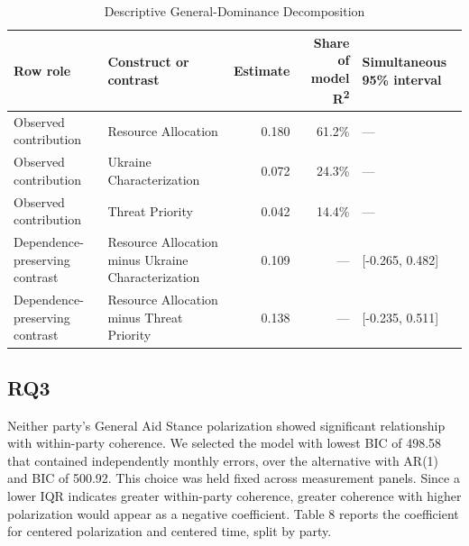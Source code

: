 \begin{table}[htbp]
\centering
\small
\begin{threeparttable}
\caption{Descriptive General-Dominance Decomposition}
\label{tab:7}
\begin{tabularx}{\textwidth}{@{}L{0.95}L{1.25}rrL{1.05}@{}}
\toprule
\textbf{Row role} & \textbf{Construct or contrast} & \textbf{Estimate} & \textbf{Share of model R\textsuperscript{2}} & \textbf{Simultaneous 95\% interval} \\
\midrule
Observed contribution & Resource Allocation & 0.180 & 61.2\% & --- \\
Observed contribution & Ukraine Characterization & 0.072 & 24.3\% & --- \\
Observed contribution & Threat Priority & 0.042 & 14.4\% & --- \\
Dependence-preserving contrast & Resource Allocation minus Ukraine Characterization & 0.109 & --- & [-0.265, 0.482] \\
Dependence-preserving contrast & Resource Allocation minus Threat Priority & 0.138 & --- & [-0.235, 0.511] \\
\bottomrule
\end{tabularx}
\end{threeparttable}
\end{table}


\subsection{RQ3}

Neither party's General Aid Stance polarization showed significant relationship with within-party coherence. We selected the model with lowest BIC of 498.58 that contained independently monthly errors, over the alternative with AR(1) and BIC of 500.92. This choice was held fixed across measurement panels. Since a lower IQR indicates greater within-party coherence, greater coherence with higher polarization would appear as a negative coefficient. Table 8 reports the coefficient for centered polarization and centered time, split by party.


